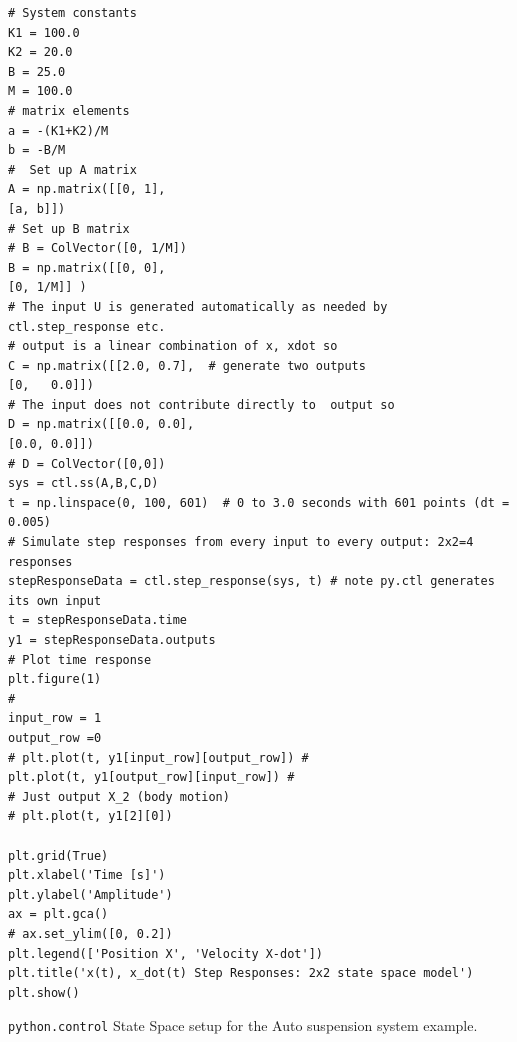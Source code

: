 \begin{listing}
\begin{verbatim}
# System constants
K1 = 100.0
K2 = 20.0
B = 25.0
M = 100.0
# matrix elements
a = -(K1+K2)/M
b = -B/M
#  Set up A matrix
A = np.matrix([[0, 1],
[a, b]])
# Set up B matrix
# B = ColVector([0, 1/M])
B = np.matrix([[0, 0],
[0, 1/M]] )
# The input U is generated automatically as needed by ctl.step_response etc.
# output is a linear combination of x, xdot so
C = np.matrix([[2.0, 0.7],  # generate two outputs
[0,   0.0]])
# The input does not contribute directly to  output so
D = np.matrix([[0.0, 0.0],
[0.0, 0.0]])
# D = ColVector([0,0])
sys = ctl.ss(A,B,C,D)
t = np.linspace(0, 100, 601)  # 0 to 3.0 seconds with 601 points (dt = 0.005)
# Simulate step responses from every input to every output: 2x2=4 responses
stepResponseData = ctl.step_response(sys, t) # note py.ctl generates its own input
t = stepResponseData.time
y1 = stepResponseData.outputs
# Plot time response
plt.figure(1)
#
input_row = 1
output_row =0
# plt.plot(t, y1[input_row][output_row]) #
plt.plot(t, y1[output_row][input_row]) #
# Just output X_2 (body motion)
# plt.plot(t, y1[2][0])

plt.grid(True)
plt.xlabel('Time [s]')
plt.ylabel('Amplitude')
ax = plt.gca()
# ax.set_ylim([0, 0.2])
plt.legend(['Position X', 'Velocity X-dot'])
plt.title('x(t), x_dot(t) Step Responses: 2x2 state space model')
plt.show()
    \end{verbatim}
    \caption{{\tt python.control} State Space setup for the Auto suspension system example.}
    \label{lst:4x4ssSetup}
\end{listing}


